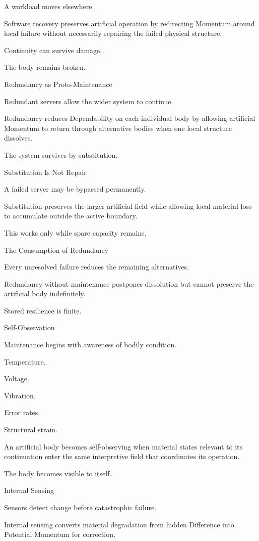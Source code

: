 A workload moves elsewhere.

Software recovery preserves artificial operation by redirecting Momentum around local failure without necessarily repairing the failed physical structure.

Continuity can survive damage.

The body remains broken.

Redundancy as Proto-Maintenance

Redundant servers allow the wider system to continue.

Redundancy reduces Dependability on each individual body by allowing artificial Momentum to return through alternative bodies when one local structure dissolves.

The system survives by substitution.

Substitution Is Not Repair

A failed server may be bypassed permanently.

Substitution preserves the larger artificial field while allowing local material loss to accumulate outside the active boundary.

This works only while spare capacity remains.

The Consumption of Redundancy

Every unresolved failure reduces the remaining alternatives.

Redundancy without maintenance postpones dissolution but cannot preserve the artificial body indefinitely.

Stored resilience is finite.

Self-Observation

Maintenance begins with awareness of bodily condition.

Temperature.

Voltage.

Vibration.

Error rates.

Structural strain.

An artificial body becomes self-observing when material states relevant to its continuation enter the same interpretive field that coordinates its operation.

The body becomes visible to itself.

Internal Sensing

Sensors detect change before catastrophic failure.

Internal sensing converts material degradation from hidden Difference into Potential Momentum for correction.

